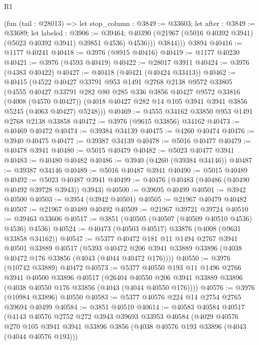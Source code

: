 \begin{lexlean}{R1}
\begin{coremodule}
            (fun (tail : @28013) =>
            let stop_column : @3849 := @33603;
            let after : @3849 := @33689;
            let labeled : @3906 := @39464;
            @40390 (@21967 (@5016 @40392 @3941) (@5023 @40392 @3941) @39851 @4536) @4536)))
          @3844)))
    @3894
@40416 := @1177 @40241
@40418 := @3976 (@8915 @40416)
@40419 := @1177 @40230
@40421 := @3976 (@4593 @40419)
@40422 := @28017 @3911
@40424 := @3976 (@4383 @40422)
@40427 := @40418 (@40421 (@40424 @33413))
@40462 := @40415
    (@4522
      @40427
      @33791
      @953
      @1491
      @2768
      @2138
      @9572
      @33805
      (@4555
        @40427
        @33791
        @282
        @80
        @285
        @336
        @3856
        @40427
        @9572
        @33816
        (@4008 (@4570 @40427))
        (@4018 @40427 @282 @14 @105 @3941 @3941 @3856 @5245 (@4063 @40427) @5248)))
@40469 := @4555 @34162 @33850 @953 @1491 @2768 @2138 @33858
@40472 := @3976 (@9615 @33856) @34162
@40473 := @40469 @40472
@40474 := @39384 @34139
@40475 := @4260 @40474
@40476 := @3940 @40475
@40477 := @39387 @34139
@40478 := @5016 @40477
@40479 := @40478 @3941
@40480 := @5015 @40479
@40482 := @5023 @40477 @3941
@40483 := @40480 @40482
@40486 := @3940 (@4260 (@39384 @34146))
@40487 := @39387 @34146
@40489 := @5016 @40487 @3941
@40490 := @5015 @40489
@40492 := @5023 @40487 @3941
@40499 := @40476 (@40483 (@40486 (@40490 @40492 @39728 @3943)) @3943)
@40500 := @39695 @40499
@40501 := @3942 @40500
@40503 := @3954 (@3942 @40501)
@40505 := @21967 @40479 @40482
@40507 := @21967 @40489 @40492
@40509 := @21967 @39721 @39724
@40510 := @39463 @33606
@40517 := @3851 (@40505 (@40507 (@40509 @40510 @4536) @4536) @4536)
@40524 := @40473 (@40503 @40517) @33876 (@4008 (@9631 @33858 @34162))
@40547 := @5377
    @40472
    @181
    @11
    @1494
    @2767
    @3941
    @40501
    @33889
    @40517
    (@5393 @40472 @206 @3941 @33889 @33896 (@4038 @40472 @176 @33856 (@4043 (@4044 @40472 @176))))
@40550 := @3976 (@10742 @33889) @40472
@40573 := @5377
    @40550
    @193
    @11
    @1496
    @2766
    @3941
    @40500
    @33896
    @40517
    (@26404 @40550 @206 @3941 @33889 @33896 (@4038 @40550 @176 @33856 (@4043 (@4044 @40550 @176))))
@40576 := @3976 (@10984 @33896) @40550
@40583 := @5377 @40576 @224 @14 @2754 @2765 @39694 @40499
@40584 := @3851 @40510
@40614 := @40583
    @40584
    @40517
    (@4143
      @40576
      @2752
      @272
      @3943
      @39693
      @33953
      @40584
      (@4029
        @40576
        @270
        @105
        @3941
        @3941
        @33896
        @3856
        (@4038 @40576 @193 @33896 (@4043 (@4044 @40576 @193)))

\end{coremodule}
\end{lexlean}
